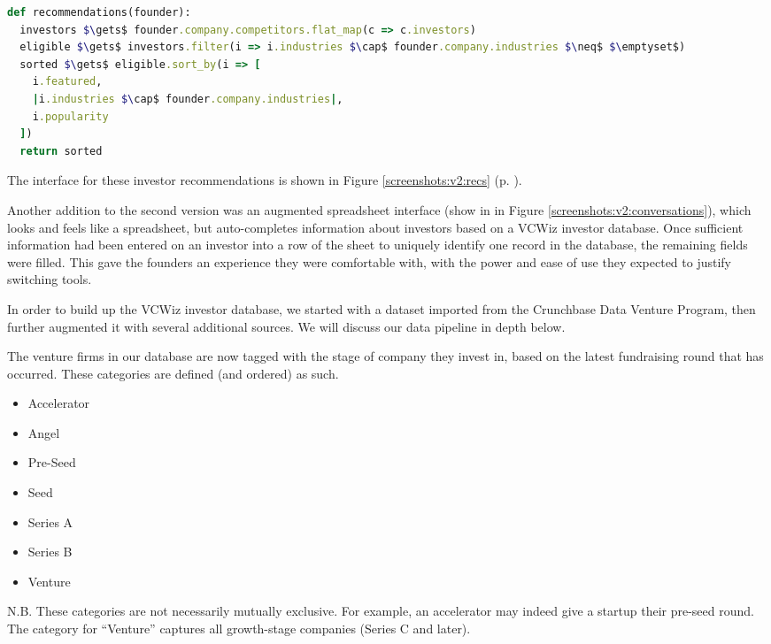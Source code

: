 \begin{lstlisting}[frame=single,mathescape=true,language=Ruby,basicstyle=\footnotesize,columns=fullflexible]
def recommendations(founder):
  investors $\gets$ founder.company.competitors.flat_map(c => c.investors)
  eligible $\gets$ investors.filter(i => i.industries $\cap$ founder.company.industries $\neq$ $\emptyset$)
  sorted $\gets$ eligible.sort_by(i => [
    i.featured,
    |i.industries $\cap$ founder.company.industries|,
    i.popularity
  ])
  return sorted
\end{lstlisting}

The interface for these investor recommendations is shown in Figure \ref{screenshots:v2:recs} (p. \pageref{screenshots:v2:recs}).

Another addition to the second version was an augmented spreadsheet interface (show in in Figure \ref{screenshots:v2:conversations}), which looks and feels like a spreadsheet, but auto-completes information about investors based on a VCWiz investor database. Once sufficient information had been entered on an investor into a row of the sheet to uniquely identify one record in the database, the remaining fields were filled. This gave the founders an experience they were comfortable with, with the power and ease of use they expected to justify switching tools.

In order to build up the VCWiz investor database, we started with a dataset imported from the Crunchbase Data Venture Program, then further augmented it with several additional sources. We will discuss our data pipeline in depth below.

The venture firms in our database are now tagged with the stage of company they invest in, based on the latest fundraising round that has occurred. These categories are defined (and ordered) as such.

\begin{multicols}{2}
\begin{itemize}
  \item Accelerator
  \item Angel
  \item Pre-Seed
  \item Seed
  \item Series A
  \item Series B
  \item Venture
\end{itemize}
\end{multicols}

N.B. These categories are not necessarily mutually exclusive. For example, an accelerator may indeed give a startup their pre-seed round. The category for ``Venture'' captures all growth-stage companies (Series C and later).

